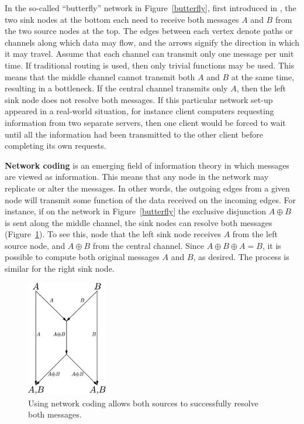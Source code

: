In the so-called ``butterfly'' network in Figure~\ref{butterfly}, first introduced in \cite{ahls2000}, the two sink nodes at the bottom each need to receive both messages $A$ and $B$ from the two source nodes at the top. The edges between each vertex denote paths or channels along which data may flow, and the arrows signify the direction in which it may travel. Assume that each channel can transmit only one message per unit time. If traditional routing is used, then only trivial functions may be used. This means that the middle channel cannot transmit both $A$ and $B$ at the same time, resulting in a bottleneck. If the central channel transmits only $A$, then the left sink node does not resolve both messages. If this particular network set-up appeared in a real-world situation, for instance client computers requesting information from two separate servers, then one client would be forced to wait until all the information had been transmitted to the other client before completing its own requests.

\textbf{Network coding} is an emerging field of information theory in which messages are viewed as information. This means that any node in the network may replicate or alter the messages. In other words, the outgoing edges from a given node will transmit some function of the data received on the incoming edges. For instance, if on the network in Figure~\ref{butterfly} the exclusive disjunction $A \oplus B$ is sent along the middle channel, the sink nodes can resolve both messages (Figure~\ref{butterfly-netcod}). To see this, node that the left sink node receives $A$ from the left source node, and $A \oplus B$ from the central channel. Since $A \oplus B \oplus A = B$, it is possible to compute both original messages $A$ and $B$, as desired. The process is similar for the right sink node.

\begin{figure}[ht]
	\centering
	\includegraphics[width=100pt]{figures/butterfly-netcod.pdf}
	\caption[The butterfly network using network coding]{Using network coding allows both sources to successfully resolve both messages.}
	\label{butterfly-netcod}
\end{figure}

